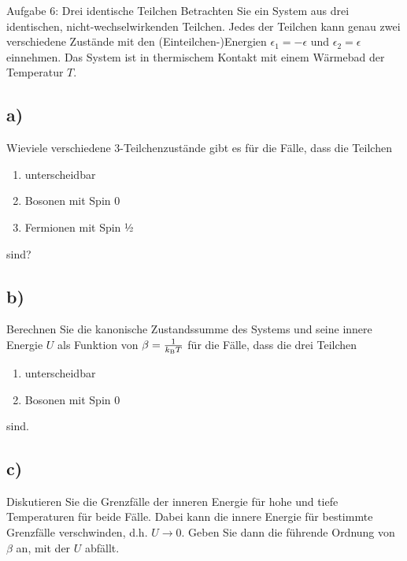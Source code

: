 \begin{aufgabe}{Aufgabe 6: Drei identische Teilchen}
    Betrachten Sie ein System aus drei identischen, nicht-wechselwirkenden Teilchen.
    Jedes der Teilchen kann genau zwei verschiedene Zustände mit den (Einteilchen-)Energien $\epsilon_1 = -\epsilon$ und $\epsilon_2 = \epsilon$ einnehmen.
    Das System ist in thermischem Kontakt mit einem Wärmebad der Temperatur $T$.

    \subsection{a)}
    Wieviele verschiedene 3-Teilchenzustände gibt es für die Fälle, dass die Teilchen
    \begin{enumerate}[label=(\roman*)]
        \item unterscheidbar
        \item Bosonen mit Spin 0
        \item Fermionen mit Spin ½
    \end{enumerate}
    sind?

    \subsection{b)}
    Berechnen Sie die kanonische Zustandssumme des Systems und seine innere Energie $U$ als Funktion von $\beta = \frac{1}{k_\text{B} T}$ für die Fälle, dass die drei Teilchen
    \begin{enumerate}[label=(\roman*)]
        \item unterscheidbar
        \item Bosonen mit Spin 0
    \end{enumerate}
    sind.

    \subsection{c)}
    Diskutieren Sie die Grenzfälle der inneren Energie für hohe und tiefe Temperaturen für beide Fälle.
    Dabei kann die innere Energie für bestimmte Grenzfälle verschwinden, d.h. $U \to 0$.
    Geben Sie dann die führende Ordnung von $\beta$ an, mit der $U$ abfällt.

\end{aufgabe}


